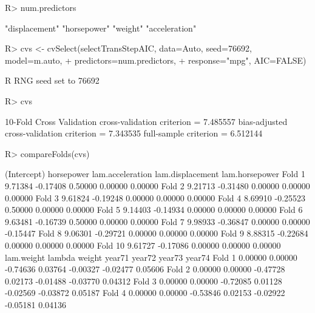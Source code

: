 \documentclass[
]{jss}
\begin{document}
\begin{CodeChunk}
\begin{CodeInput}
R> num.predictors
\end{CodeInput}
\begin{CodeOutput}
[1] "displacement" "horsepower"   "weight"       "acceleration"
\end{CodeOutput}
\begin{CodeInput}
R> cvs <- cvSelect(selectTransStepAIC, data=Auto, seed=76692, model=m.auto,
+                 predictors=num.predictors,
+                 response="mpg", AIC=FALSE)
\end{CodeInput}
\begin{CodeOutput}
R RNG seed set to 76692
\end{CodeOutput}
\begin{CodeInput}
R> cvs
\end{CodeInput}
\begin{CodeOutput}
10-Fold Cross Validation
cross-validation criterion = 7.485557
bias-adjusted cross-validation criterion = 7.343535
full-sample criterion = 6.512144 
\end{CodeOutput}
\begin{CodeInput}
R> compareFolds(cvs)
\end{CodeInput}
\begin{CodeOutput}
        (Intercept) horsepower lam.acceleration lam.displacement lam.horsepower
Fold 1      9.71384   -0.17408          0.50000          0.00000        0.00000
Fold 2      9.21713   -0.31480          0.00000          0.00000        0.00000
Fold 3      9.61824   -0.19248          0.00000          0.00000        0.00000
Fold 4      8.69910   -0.25523          0.50000          0.00000        0.00000
Fold 5      9.14403   -0.14934          0.00000          0.00000        0.00000
Fold 6      9.63481   -0.16739          0.50000          0.00000        0.00000
Fold 7      9.98933   -0.36847          0.00000          0.00000       -0.15447
Fold 8      9.06301   -0.29721          0.00000          0.00000        0.00000
Fold 9      8.88315   -0.22684          0.00000          0.00000        0.00000
Fold 10     9.61727   -0.17086          0.00000          0.00000        0.00000
        lam.weight   lambda   weight   year71   year72   year73   year74
Fold 1     0.00000  0.00000 -0.74636  0.03764 -0.00327 -0.02477  0.05606
Fold 2     0.00000  0.00000 -0.47728  0.02173 -0.01488 -0.03770  0.04312
Fold 3     0.00000  0.00000 -0.72085  0.01128 -0.02569 -0.03872  0.05187
Fold 4     0.00000  0.00000 -0.53846  0.02153 -0.02922 -0.05181  0.04136

\end{CodeOutput}
\end{CodeChunk}
\end{document}
